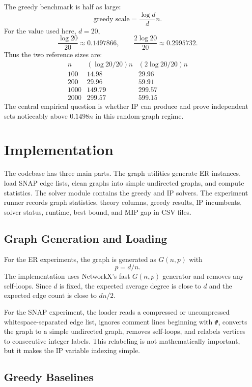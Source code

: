 \documentclass[11pt]{article}
\begin{document}
The greedy benchmark is half as large:
\[
  \text{greedy scale} = \frac{\log d}{d}n.
\]
For the value used here, $d=20$,
\[
  \frac{\log 20}{20} \approx 0.1497866,
  \qquad
  \frac{2\log 20}{20} \approx 0.2995732.
\]
Thus the two reference sizes are:
\[
\begin{array}{c|cc}
n & (\log 20/20)n & (2\log 20/20)n\\
\hline
100 & 14.98 & 29.96\\
200 & 29.96 & 59.91\\
1000 & 149.79 & 299.57\\
2000 & 299.57 & 599.15
\end{array}
\]
The central empirical question is whether IP can produce and prove independent
sets noticeably above $0.1498n$ in this random-graph regime.

\section{Implementation}

The codebase has three main parts. The graph utilities generate ER instances,
load SNAP edge lists, clean graphs into simple undirected graphs, and compute
statistics. The solver module contains the greedy and IP solvers. The
experiment runner records graph statistics, theory columns, greedy results, IP
incumbents, solver status, runtime, best bound, and MIP gap in CSV files.

\subsection{Graph Generation and Loading}

For the ER experiments, the graph is generated as $G(n,p)$ with
\[
  p = d/n.
\]
The implementation uses NetworkX's fast $G(n,p)$ generator and removes any
self-loops. Since $d$ is fixed, the expected average degree is close to $d$ and
the expected edge count is close to $dn/2$.

For the SNAP experiment, the loader reads a compressed or uncompressed
whitespace-separated edge list, ignores comment lines beginning with
\texttt{\#}, converts the graph to a simple undirected graph, removes
self-loops, and relabels vertices to consecutive integer labels. This relabeling
is not mathematically important, but it makes the IP variable indexing simple.

\subsection{Greedy Baselines}
\end{document}
